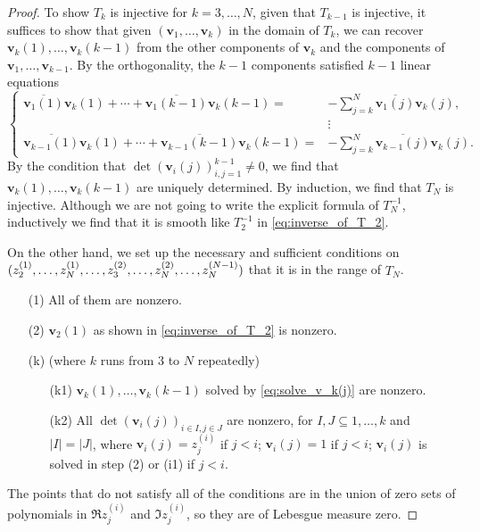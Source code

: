 \documentclass[11pt, a4paper]{article}
\numberwithin{equation}{section}
\renewcommand{\vec}[1]{\mathbf{#1}}
\theoremstyle{definition}
\theoremstyle{remark}
\begin{document}
\begin{proof}
  To show $T_k$ is injective for $k = 3, \dotsc, N$, given that $T_{k - 1}$ is injective, it suffices to show that given $(\vec{v}_1, \dotsc, \vec{v}_k)$ in the domain of $T_k$, we can recover $\vec{v}_k(1), \dotsc, \vec{v}_k(k - 1)$ from the other components of $\vec{v}_k$ and the components of $\vec{v}_1, \dotsc, \vec{v}_{k - 1}$. By the orthogonality, the $k - 1$ components satisfied $k - 1$ linear equations
  \begin{equation} \label{eq:solve_v_k(j)}
    \left\{
      \begin{aligned}
        \overline{\vec{v}_1(1)} \vec{v}_k(1) + \dotsb + \overline{\vec{v}_1(k - 1)} \vec{v}_k(k - 1) = {}& -\sum^N_{j = k} \overline{\vec{v}_1(j)} \vec{v}_k(j), \\
        & \vdots \\
        \overline{\vec{v}_{k - 1}(1)} \vec{v}_k(1) + \dotsb + \overline{\vec{v}_{k - 1}(k - 1)} \vec{v}_k(k - 1) = {}& -\sum^N_{j = k} \overline{\vec{v}_{k - 1}(j)} \vec{v}_k(j).
      \end{aligned}
      \right.
  \end{equation}
  By the condition that $\det(\vec{v}_i(j))^{k - 1}_{i, j = 1} \neq 0$, we find that $\vec{v}_k(1), \dotsc, \vec{v}_k(k - 1)$ are uniquely determined. By induction, we find that $T_N$ is injective. Although we are not going to write the explicit formula of $T^{-1}_N$, inductively we find that it is smooth like $T^{-1}_2$ in \eqref{eq:inverse_of_T_2}.

  On the other hand, we set up the necessary and sufficient conditions on $(z^{(1)}_2, \dotsc, \linebreak[0] z^{(1)}_N, \dotsc, \linebreak[0] z^{(2)}_3, \dotsc, \linebreak[0] z^{(2)}_N, \dotsc, \linebreak[0] z^{(N - 1)}_N)$ that it is in the range of $T_N$.
  \begin{itemize}
  \item[(1)]
    All of them are nonzero.
  \item[(2)]
    $\vec{v}_2(1)$ as shown in \eqref{eq:inverse_of_T_2} is nonzero.
  \item[(k)] (where $k$ runs from $3$ to $N$ repeatedly)
    \begin{itemize}
    \item[(k1)]
      $\vec{v}_k(1), \dotsc, \vec{v}_k(k - 1)$ solved by \eqref{eq:solve_v_k(j)} are nonzero.
    \item[(k2)]
      All $\det(\vec{v}_i(j))_{i \in I, j \in J}$ are nonzero, for $I, J \subseteq {1, \dotsc, k}$ and $\lvert I \rvert = \lvert J \rvert$, where $\vec{v}_i(j) = z^{(i)}_j$ if $j < i$; $\vec{v}_i(j) = 1$ if $j < i$; $\vec{v}_i(j)$ is solved in step (2) or (i1) if $j < i$.
    \end{itemize}
  \end{itemize}
  The points that do not satisfy all of the conditions are in the union of zero sets of polynomials in $\Re z^{(i)}_j$ and $\Im z^{(i)}_j$, so they are of Lebesgue measure zero.
\end{proof}
\end{document}
